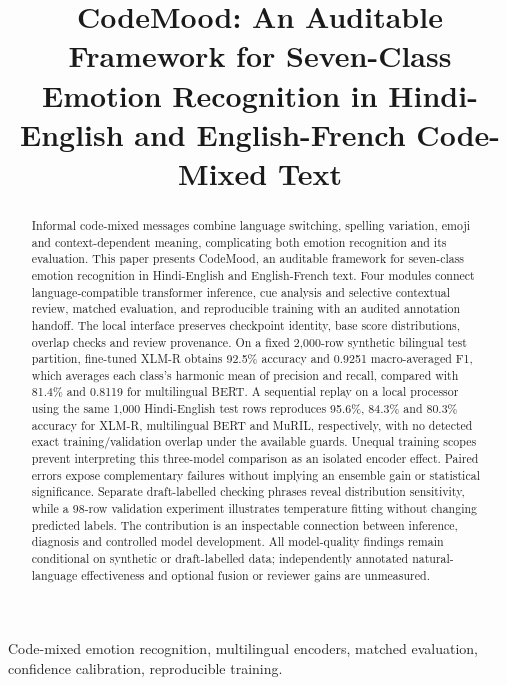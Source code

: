 \documentclass[journal]{IEEEtran}
\title{CodeMood: An Auditable Framework for Seven-Class Emotion Recognition in Hindi-English and English-French Code-Mixed Text}
\begin{document}
\raggedbottom
\renewcommand{\dblfloatpagefraction}{0.6}
\renewcommand{\floatpagefraction}{0.6}
\maketitle
\begin{abstract}

Informal code-mixed messages combine language switching, spelling variation, emoji and context-dependent meaning, complicating both emotion recognition and its evaluation. This paper presents CodeMood, an auditable framework for seven-class emotion recognition in Hindi-English and English-French text. Four modules connect language-compatible transformer inference, cue analysis and selective contextual review, matched evaluation, and reproducible training with an audited annotation handoff. The local interface preserves checkpoint identity, base score distributions, overlap checks and review provenance. On a fixed 2,000-row synthetic bilingual test partition, fine-tuned XLM-R obtains 92.5\% accuracy and 0.9251 macro-averaged F1, which averages each class's harmonic mean of precision and recall, compared with 81.4\% and 0.8119 for multilingual BERT. A sequential replay on a local processor using the same 1,000 Hindi-English test rows reproduces 95.6\%, 84.3\% and 80.3\% accuracy for XLM-R, multilingual BERT and MuRIL, respectively, with no detected exact training/validation overlap under the available guards. Unequal training scopes prevent interpreting this three-model comparison as an isolated encoder effect. Paired errors expose complementary failures without implying an ensemble gain or statistical significance. Separate draft-labelled checking phrases reveal distribution sensitivity, while a 98-row validation experiment illustrates temperature fitting without changing predicted labels. The contribution is an inspectable connection between inference, diagnosis and controlled model development. All model-quality findings remain conditional on synthetic or draft-labelled data; independently annotated natural-language effectiveness and optional fusion or reviewer gains are unmeasured.

\end{abstract}

\begin{IEEEkeywords}

Code-mixed emotion recognition, multilingual encoders, matched evaluation, confidence calibration, reproducible training.

\end{IEEEkeywords}
\end{document}
